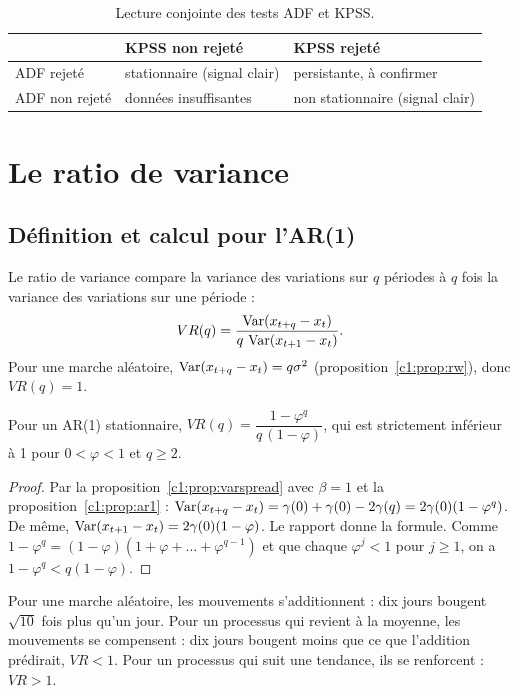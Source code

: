 \begin{table}[h]
\centering\small
\caption{Lecture conjointe des tests ADF et KPSS.}
\label{c3:tab:decision}
\begin{tabular}{lll}
\toprule
 & KPSS non rejeté & KPSS rejeté \\
\midrule
ADF rejeté & stationnaire (signal clair) & persistante, à confirmer \\
ADF non rejeté & données insuffisantes & non stationnaire (signal clair) \\
\bottomrule
\end{tabular}
\end{table}

\section{Le ratio de variance}

\subsection{Définition et calcul pour l'AR(1)}

Le ratio de variance compare la variance des variations sur $q$ périodes à $q$ fois la variance des variations sur une période :
\[
VR(q) = \frac{\operatorname{Var}(x_{t+q} - x_t)}{q\,\operatorname{Var}(x_{t+1}-x_t)}.
\]
Pour une marche aléatoire, $\operatorname{Var}(x_{t+q}-x_t) = q\sigma^2$ (proposition~\ref{c1:prop:rw}), donc $VR(q) = 1$.

\begin{proposition}\label{c3:prop:vr}
Pour un AR(1) stationnaire, $VR(q) = \dfrac{1-\varphi^q}{q\,(1-\varphi)}$, qui est strictement inférieur à 1 pour $0<\varphi<1$ et $q\ge2$.
\end{proposition}
\begin{proof}
Par la proposition~\ref{c1:prop:varspread} avec $\beta = 1$ et la proposition~\ref{c1:prop:ar1} : $\operatorname{Var}(x_{t+q}-x_t) = \gamma(0) + \gamma(0) - 2\gamma(q) = 2\gamma(0)(1-\varphi^q)$. De même, $\operatorname{Var}(x_{t+1}-x_t) = 2\gamma(0)(1-\varphi)$. Le rapport donne la formule. Comme $1-\varphi^q = (1-\varphi)(1+\varphi+\dots+\varphi^{q-1})$ et que chaque $\varphi^j < 1$ pour $j \ge 1$, on a $1-\varphi^q < q(1-\varphi)$.
\end{proof}

\begin{intuition}
Pour une marche aléatoire, les mouvements s'additionnent : dix jours bougent $\sqrt{10}$ fois plus qu'un jour. Pour un processus qui revient à la moyenne, les mouvements se compensent : dix jours bougent moins que ce que l'addition prédirait, $VR < 1$. Pour un processus qui suit une tendance, ils se renforcent : $VR > 1$.
\end{intuition}


